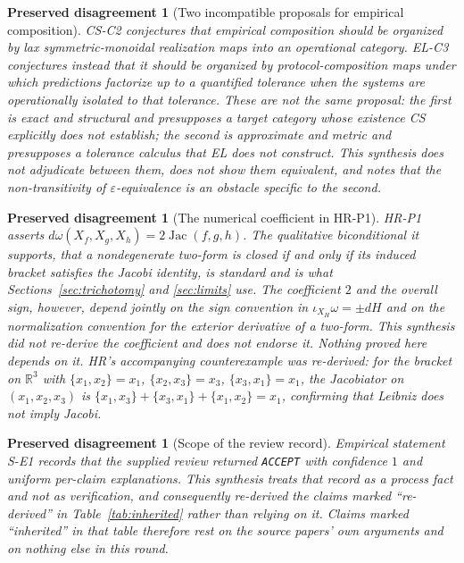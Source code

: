 \documentclass[11pt]{article}
\theoremstyle{plain}
\newtheorem{disagreement}[definition]{Preserved disagreement}
\newcommand{\R}{\mathbb{R}}
\begin{document}
\begin{disagreement}[Two incompatible proposals for empirical composition]
CS-C2 conjectures that empirical composition should be organized by \emph{lax
symmetric-monoidal realization maps} into an operational category. EL-C3
conjectures instead that it should be organized by \emph{protocol-composition
maps} under which predictions factorize \emph{up to a quantified tolerance} when
the systems are operationally isolated to that tolerance. These are not the same
proposal: the first is exact and structural and presupposes a target category
whose existence CS explicitly does not establish; the second is approximate and
metric and presupposes a tolerance calculus that EL does not construct. This
synthesis does not adjudicate between them, does not show them equivalent, and
notes that the non-transitivity of $\varepsilon$-equivalence is an obstacle
specific to the second.
\end{disagreement}

\begin{disagreement}[The numerical coefficient in HR-P1]
HR-P1 asserts $d\omega(X_f,X_g,X_h)=2\operatorname{Jac}(f,g,h)$. The
\emph{qualitative} biconditional it supports, that a nondegenerate two-form is
closed if and only if its induced bracket satisfies the Jacobi identity, is
standard and is what Sections~\ref{sec:trichotomy} and \ref{sec:limits} use. The
coefficient $2$ and the overall sign, however, depend jointly on the sign
convention in $\iota_{X_H}\omega=\pm dH$ and on the normalization convention for
the exterior derivative of a two-form. This synthesis did not re-derive the
coefficient and does not endorse it. Nothing proved here depends on it. HR's
accompanying counterexample \emph{was} re-derived: for the bracket on $\R^3$
with $\{x_1,x_2\}=x_1$, $\{x_2,x_3\}=x_3$, $\{x_3,x_1\}=x_1$, the Jacobiator on
$(x_1,x_2,x_3)$ is $\{x_1,x_3\}+\{x_3,x_1\}+\{x_1,x_2\}=x_1$, confirming that
Leibniz does not imply Jacobi.
\end{disagreement}

\begin{disagreement}[Scope of the review record]
Empirical statement S-E1 records that the supplied review returned
\texttt{ACCEPT} with confidence $1$ and uniform per-claim explanations. This
synthesis treats that record as a process fact and not as verification, and
consequently re-derived the claims marked ``re-derived'' in
Table~\ref{tab:inherited} rather than relying on it. Claims marked ``inherited''
in that table therefore rest on the source papers' own arguments and on nothing
else in this round.
\end{disagreement}
\end{document}
